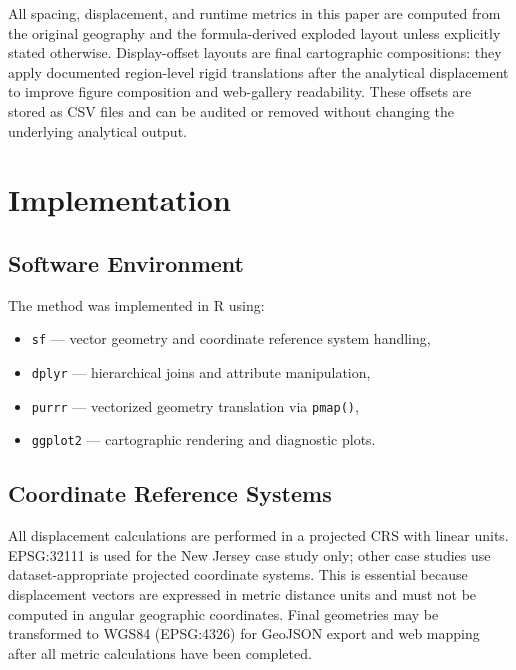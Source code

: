 \documentclass[12pt, a4paper]{article}
\numberwithin{equation}{section}
\begin{document}
All spacing, displacement, and runtime metrics in this paper are computed from the original geography and the formula-derived exploded layout unless explicitly stated otherwise. Display-offset layouts are final cartographic compositions: they apply documented region-level rigid translations after the analytical displacement to improve figure composition and web-gallery readability. These offsets are stored as CSV files and can be audited or removed without changing the underlying analytical output.

\section{Implementation}

\subsection{Software Environment}

The method was implemented in \textsf{R} using:
\begin{itemize}
  \item \texttt{sf} --- vector geometry and coordinate reference system handling,
  \item \texttt{dplyr} --- hierarchical joins and attribute manipulation,
  \item \texttt{purrr} --- vectorized geometry translation via \texttt{pmap()},
  \item \texttt{ggplot2} --- cartographic rendering and diagnostic plots.
\end{itemize}

\subsection{Coordinate Reference Systems}

All displacement calculations are performed in a projected CRS with linear units. EPSG:32111 is used for the New Jersey case study only; other case studies use dataset-appropriate projected coordinate systems. This is essential because displacement vectors are expressed in metric distance units and must not be computed in angular geographic coordinates. Final geometries may be transformed to WGS84 (EPSG:4326) for GeoJSON export and web mapping after all metric calculations have been completed.
\end{document}
